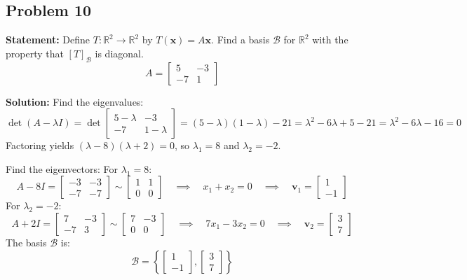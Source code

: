\documentclass[11pt, a4paper]{article}
\theoremstyle{definition}
\theoremstyle{remark}
\newcommand{\R}{\mathbb{R}}
\begin{document}
\subsection{Problem 10}
\textbf{Statement:} Define $T: \R^2 \to \R^2$ by $T(\mathbf{x}) = A\mathbf{x}$. Find a basis $\mathcal{B}$ for $\R^2$ with the property that $[T]_\mathcal{B}$ is diagonal.
\[
A = \begin{bmatrix} 5 & -3 \\ -7 & 1 \end{bmatrix}
\]

\textbf{Solution:}
Find the eigenvalues:
\[
\det(A - \lambda I) = \det \begin{bmatrix} 5 - \lambda & -3 \\ -7 & 1 - \lambda \end{bmatrix} = (5 - \lambda)(1 - \lambda) - 21 = \lambda^2 - 6\lambda + 5 - 21 = \lambda^2 - 6\lambda - 16 = 0
\]
Factoring yields $(\lambda - 8)(\lambda + 2) = 0$, so $\lambda_1 = 8$ and $\lambda_2 = -2$.

Find the eigenvectors:
For $\lambda_1 = 8$:
\[
A - 8I = \begin{bmatrix} -3 & -3 \\ -7 & -7 \end{bmatrix} \sim \begin{bmatrix} 1 & 1 \\ 0 & 0 \end{bmatrix} \quad \implies \quad x_1 + x_2 = 0 \quad \implies \quad \mathbf{v}_1 = \begin{bmatrix} 1 \\ -1 \end{bmatrix}
\]
For $\lambda_2 = -2$:
\[
A + 2I = \begin{bmatrix} 7 & -3 \\ -7 & 3 \end{bmatrix} \sim \begin{bmatrix} 7 & -3 \\ 0 & 0 \end{bmatrix} \quad \implies \quad 7x_1 - 3x_2 = 0 \quad \implies \quad \mathbf{v}_2 = \begin{bmatrix} 3 \\ 7 \end{bmatrix}
\]
The basis $\mathcal{B}$ is:
\[
\mathcal{B} = \left\{ \begin{bmatrix} 1 \\ -1 \end{bmatrix}, \begin{bmatrix} 3 \\ 7 \end{bmatrix} \right\}
\]
\end{document}
